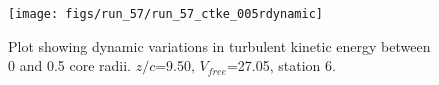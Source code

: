\begin{figure}[H]
\centering
\texttt{[image: figs/run\_57/run\_57\_ctke\_005rdynamic]}
\caption{Plot showing dynamic variations in turbulent kinetic energy between 0 and 0.5 core radii. $z/c$=9.50, $V_{free}$=27.05, station 6.}
\end{figure}


